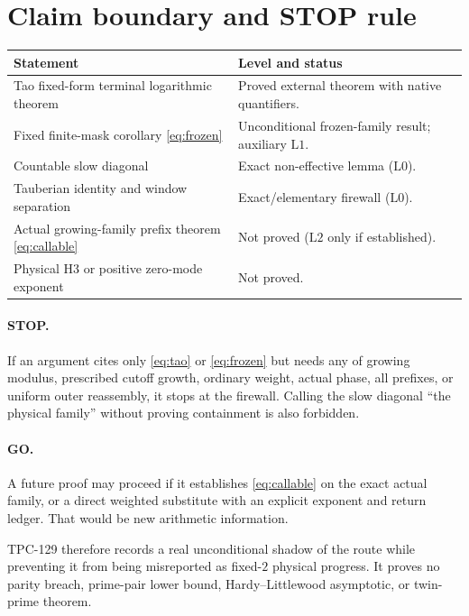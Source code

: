 \documentclass[11pt]{article}
\theoremstyle{definition}
\theoremstyle{remark}
\newcommand{\Lzero}{\mathrm{L0}}
\newcommand{\Lone}{\mathrm{L1}}
\newcommand{\Ltwo}{\mathrm{L2}}
\begin{document}
\section{Claim boundary and STOP rule}

\begin{center}
\small
\begin{tabularx}{\textwidth}{@{}p{}X@{}}
\toprule
Statement & Level and status\\
\midrule
Tao fixed-form terminal logarithmic theorem
& Proved external theorem with native quantifiers.\\
Fixed finite-mask corollary \eqref{eq:frozen}
& Unconditional frozen-family result; auxiliary \(\Lone\).\\
Countable slow diagonal
& Exact non-effective lemma (\(\Lzero\)).\\
Tauberian identity and window separation
& Exact/elementary firewall (\(\Lzero\)).\\
Actual growing-family prefix theorem \eqref{eq:callable}
& Not proved (\(\Ltwo\) only if established).\\
Physical H3 or positive zero-mode exponent
& Not proved.\\
\bottomrule
\end{tabularx}
\end{center}

\paragraph{STOP.}
If an argument cites only \eqref{eq:tao} or
\eqref{eq:frozen} but needs any of growing modulus, prescribed
cutoff growth, ordinary weight, actual phase, all prefixes, or
uniform outer reassembly, it stops at the firewall.  Calling the
slow diagonal ``the physical family'' without proving containment is
also forbidden.

\paragraph{GO.}
A future proof may proceed if it establishes
\eqref{eq:callable} on the exact actual family, or a direct weighted
substitute with an explicit exponent and return ledger.  That would
be new arithmetic information.

TPC-129 therefore records a real unconditional shadow of the route
while preventing it from being misreported as fixed-\(2\) physical
progress.  It proves no parity breach, prime-pair lower bound,
Hardy--Littlewood asymptotic, or twin-prime theorem.

\begingroup
\footnotesize
\raggedright


\endgroup
\end{document}
